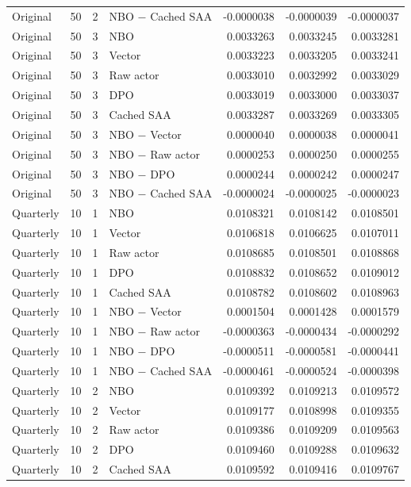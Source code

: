 \begin{longtable}{llrlrrr}
Original & 50 & 2 & NBO $-$ Cached SAA & -0.0000038 & -0.0000039 & -0.0000037 \\
Original & 50 & 3 & NBO & 0.0033263 & 0.0033245 & 0.0033281 \\
Original & 50 & 3 & Vector & 0.0033223 & 0.0033205 & 0.0033241 \\
Original & 50 & 3 & Raw actor & 0.0033010 & 0.0032992 & 0.0033029 \\
Original & 50 & 3 & DPO & 0.0033019 & 0.0033000 & 0.0033037 \\
Original & 50 & 3 & Cached SAA & 0.0033287 & 0.0033269 & 0.0033305 \\
Original & 50 & 3 & NBO $-$ Vector & 0.0000040 & 0.0000038 & 0.0000041 \\
Original & 50 & 3 & NBO $-$ Raw actor & 0.0000253 & 0.0000250 & 0.0000255 \\
Original & 50 & 3 & NBO $-$ DPO & 0.0000244 & 0.0000242 & 0.0000247 \\
Original & 50 & 3 & NBO $-$ Cached SAA & -0.0000024 & -0.0000025 & -0.0000023 \\
Quarterly & 10 & 1 & NBO & 0.0108321 & 0.0108142 & 0.0108501 \\
Quarterly & 10 & 1 & Vector & 0.0106818 & 0.0106625 & 0.0107011 \\
Quarterly & 10 & 1 & Raw actor & 0.0108685 & 0.0108501 & 0.0108868 \\
Quarterly & 10 & 1 & DPO & 0.0108832 & 0.0108652 & 0.0109012 \\
Quarterly & 10 & 1 & Cached SAA & 0.0108782 & 0.0108602 & 0.0108963 \\
Quarterly & 10 & 1 & NBO $-$ Vector & 0.0001504 & 0.0001428 & 0.0001579 \\
Quarterly & 10 & 1 & NBO $-$ Raw actor & -0.0000363 & -0.0000434 & -0.0000292 \\
Quarterly & 10 & 1 & NBO $-$ DPO & -0.0000511 & -0.0000581 & -0.0000441 \\
Quarterly & 10 & 1 & NBO $-$ Cached SAA & -0.0000461 & -0.0000524 & -0.0000398 \\
Quarterly & 10 & 2 & NBO & 0.0109392 & 0.0109213 & 0.0109572 \\
Quarterly & 10 & 2 & Vector & 0.0109177 & 0.0108998 & 0.0109355 \\
Quarterly & 10 & 2 & Raw actor & 0.0109386 & 0.0109209 & 0.0109563 \\
Quarterly & 10 & 2 & DPO & 0.0109460 & 0.0109288 & 0.0109632 \\
Quarterly & 10 & 2 & Cached SAA & 0.0109592 & 0.0109416 & 0.0109767 \\

\end{longtable}
